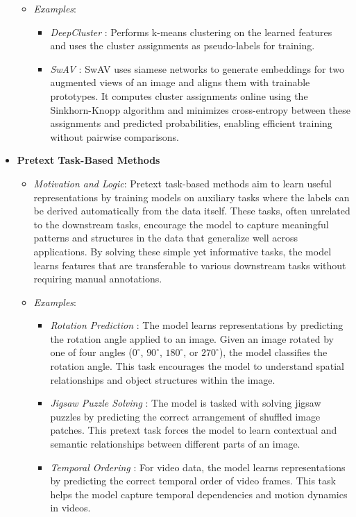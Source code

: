 \begin{itemize}
\begin{itemize}
        \item \emph{Examples}:
        \begin{itemize}
            \item \emph{DeepCluster} \citep{caron2018deep}: Performs k-means clustering on the learned features and uses the cluster assignments as pseudo-labels for training.
            \item \emph{SwAV} \citep{caron2020unsupervised}: SwAV uses siamese networks to generate embeddings for two augmented views of an image and aligns them with trainable prototypes. It computes cluster assignments online using the Sinkhorn-Knopp algorithm and minimizes cross-entropy between these assignments and predicted probabilities, enabling efficient training without pairwise comparisons.
        \end{itemize}
    \end{itemize}
    \item \textbf{Pretext Task-Based Methods}
    \begin{itemize}
         \item \emph{Motivation and Logic}: Pretext task-based methods aim to learn useful representations by training models on auxiliary tasks where the labels can be derived automatically from the data itself. These tasks, often unrelated to the downstream tasks, encourage the model to capture meaningful patterns and structures in the data that generalize well across applications. By solving these simple yet informative tasks, the model learns features that are transferable to various downstream tasks without requiring manual annotations.

    \item \emph{Examples}:
    \begin{itemize}
        \item \emph{Rotation Prediction} \citep{gidaris2018unsupervised}: The model learns representations by predicting the rotation angle applied to an image. Given an image rotated by one of four angles (\(0^\circ\), \(90^\circ\), \(180^\circ\), or \(270^\circ\)), the model classifies the rotation angle. This task encourages the model to understand spatial relationships and object structures within the image.

        \item \emph{Jigsaw Puzzle Solving} \citep{noroozi2016unsupervised}: The model is tasked with solving jigsaw puzzles by predicting the correct arrangement of shuffled image patches. This pretext task forces the model to learn contextual and semantic relationships between different parts of an image.
        
        \item \emph{Temporal Ordering} \citep{misra2016shuffle}: For video data, the model learns representations by predicting the correct temporal order of video frames. This task helps the model capture temporal dependencies and motion dynamics in videos.
    \end{itemize}
    \end{itemize}

\end{itemize}


